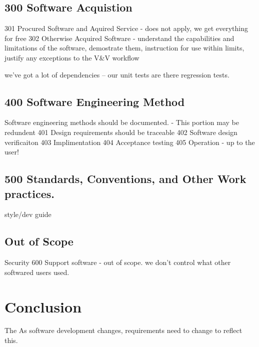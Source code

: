 \documentclass{anstrans}
\begin{document}
\subsection{300 Software Acquistion}
301 Procured Software and Aquired Service - does not apply, we get everything for free
302 Otherwise Acquired Software - understand the capabilities and limitations of the software, demostrate them, instruction for use within limits, justify any exceptions to the V\&V workflow

we've got a lot of dependencies -- our unit tests are there regression tests.

\subsection{400 Software Engineering Method}
Software engineering methods should be documented.
- This portion may be redundent
401 Design requirements should be traceable
402 Software design verificaiton
403 Implimentation
404 Acceptance testing
405 Operation - up to the user!

\subsection{500 Standards, Conventions, and Other Work practices.}

style/dev guide


\subsection{Out of Scope}
Security
600 Support software - out of scope. we don't control what other softwared users used. 


\section{Conclusion}

The 
As software development changes, requirements need to change to reflect this.



\end{document}
